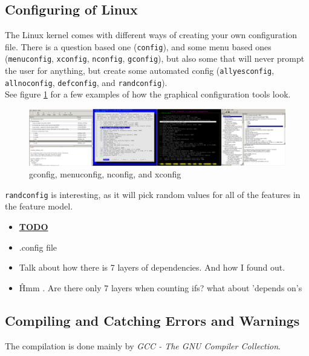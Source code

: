 \documentclass[a4paper,11pt]{report}
\newcommand{\figa}{
    \begin{figure}[!htpb]
    \centering
}
\newcommand{\figb}[2]{
    \caption{#1}
    \label{#2}
    \end{figure}
}
\begin{document}
        \subsection{Configuring of Linux}

The Linux kernel comes with different ways of creating your own configuration 
file. There is a question based one (\texttt{config}), and some menu based ones 
(\texttt{menuconfig}, \texttt{xconfig}, \texttt{nconfig}, \texttt{gconfig}), 
but also some that will never prompt the user for anything, but create some 
automated config (\texttt{allyesconfig}, \texttt{allnoconfig}, 
\texttt{defconfig}, and \texttt{randconfig}).
\\

See figure \ref{fig:lineofconfigs} for a few examples of how the graphical 
configuration tools look.
\\


\figa
    \includegraphics[scale=0.25]{pngs/configs50percent.png}
\figb{gconfig, menuconfig, nconfig, and xconfig}{fig:lineofconfigs}

\texttt{randconfig} is interesting, as it will pick random values for all of 
the features in the feature model.
\\



\begin{itemize}
    \item \underline{\textbf{TODO}}
    \item .config file
    \item Talk about how there is 7 layers of dependencies. And how I found out.
    \item \^ Hmm . Are there only 7 layers when counting ifs? what about 
        'depends on's
\end{itemize}


\subsection{Compiling and Catching Errors and Warnings}

The compilation is done mainly by \emph{GCC - The GNU Compiler Collection}.
\end{document}
